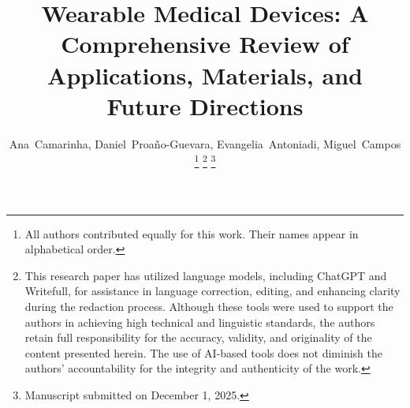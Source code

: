 \documentclass[journal]{IEEEtran}
\begin{document}
%
\title{Wearable Medical Devices: A Comprehensive Review of Applications, Materials, and Future Directions}
%
%
%

\author{Ana~Camarinha,
        Daniel~Proaño-Guevara,
        Evangelia~Antoniadi,
        Miguel~Campos%

\thanks{All authors contributed equally for this work. Their names appear in alphabetical order.}%
\thanks{This research paper has utilized language models, including ChatGPT and Writefull, for assistance in language correction, editing, and enhancing clarity during the redaction process. Although these tools were used to support the authors in achieving high technical and linguistic standards, the authors retain full responsibility for the accuracy, validity, and originality of the content presented herein. The use of AI-based tools does not diminish the authors’ accountability for the integrity and authenticity of the work.}%
\thanks{Manuscript submitted on December 1, 2025.}}

% 
%
\end{document}
